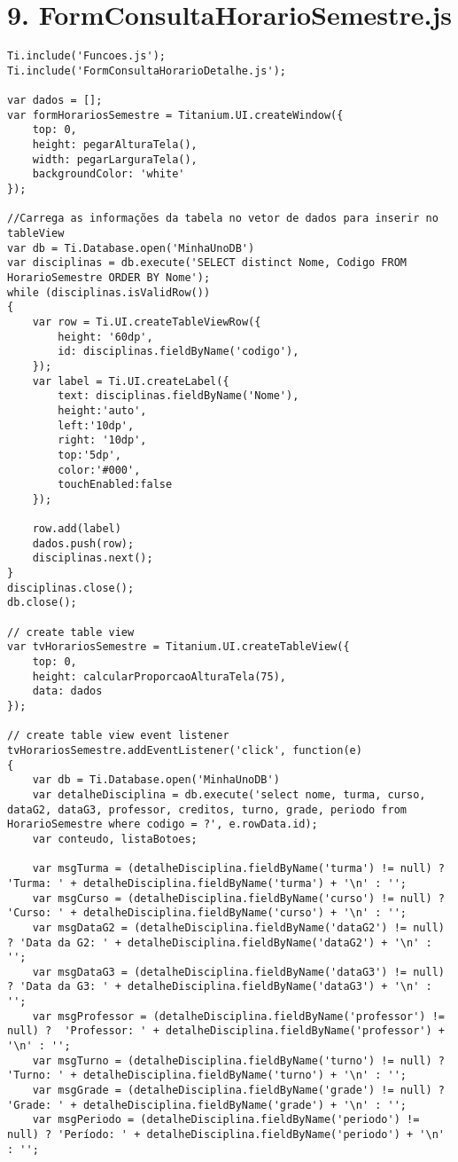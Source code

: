 \section*{9. FormConsultaHorarioSemestre.js}
\begin{lstlisting}
Ti.include('Funcoes.js');
Ti.include('FormConsultaHorarioDetalhe.js');

var dados = [];
var formHorariosSemestre = Titanium.UI.createWindow({
	top: 0,
	height: pegarAlturaTela(),
	width: pegarLarguraTela(),
	backgroundColor: 'white'
});

//Carrega as informações da tabela no vetor de dados para inserir no tableView
var db = Ti.Database.open('MinhaUnoDB')
var disciplinas = db.execute('SELECT distinct Nome, Codigo FROM HorarioSemestre ORDER BY Nome');
while (disciplinas.isValidRow())
{
	var row = Ti.UI.createTableViewRow({
		height: '60dp',
		id: disciplinas.fieldByName('codigo'),
	});
	var label = Ti.UI.createLabel({
		text: disciplinas.fieldByName('Nome'),
		height:'auto',
		left:'10dp',
		right: '10dp',
		top:'5dp',
		color:'#000',
		touchEnabled:false
	});
	
	row.add(label)
	dados.push(row);
	disciplinas.next();
}
disciplinas.close();
db.close();

// create table view
var tvHorariosSemestre = Titanium.UI.createTableView({
	top: 0,
	height: calcularProporcaoAlturaTela(75),
	data: dados
});
 
// create table view event listener
tvHorariosSemestre.addEventListener('click', function(e)
{
	var db = Ti.Database.open('MinhaUnoDB')
	var detalheDisciplina = db.execute('select nome, turma, curso, dataG2, dataG3, professor, creditos, turno, grade, periodo from HorarioSemestre where codigo = ?', e.rowData.id);
	var conteudo, listaBotoes;
	
	var msgTurma = (detalheDisciplina.fieldByName('turma') != null) ? 'Turma: ' + detalheDisciplina.fieldByName('turma') + '\n' : '';
	var msgCurso = (detalheDisciplina.fieldByName('curso') != null) ? 'Curso: ' + detalheDisciplina.fieldByName('curso') + '\n' : '';
	var msgDataG2 = (detalheDisciplina.fieldByName('dataG2') != null) ? 'Data da G2: ' + detalheDisciplina.fieldByName('dataG2') + '\n' : '';
	var msgDataG3 = (detalheDisciplina.fieldByName('dataG3') != null) ? 'Data da G3: ' + detalheDisciplina.fieldByName('dataG3') + '\n' : '';
	var msgProfessor = (detalheDisciplina.fieldByName('professor') != null) ?  'Professor: ' + detalheDisciplina.fieldByName('professor') + '\n' : '';
	var msgTurno = (detalheDisciplina.fieldByName('turno') != null) ? 'Turno: ' + detalheDisciplina.fieldByName('turno') + '\n' : '';
	var msgGrade = (detalheDisciplina.fieldByName('grade') != null) ? 'Grade: ' + detalheDisciplina.fieldByName('grade') + '\n' : '';
	var msgPeriodo = (detalheDisciplina.fieldByName('periodo') != null) ? 'Período: ' + detalheDisciplina.fieldByName('periodo') + '\n' : '';
	

\end{lstlisting}
